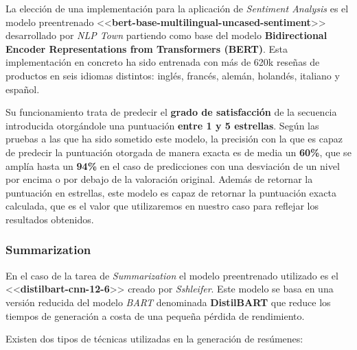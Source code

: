 La elección de una implementación para la aplicación de \emph{Sentiment Analysis} \cite{huggingface:bert_base_multilingual_uncased_sentiment}es el modelo preentrenado <<\textbf{bert-base-multilingual-uncased-sentiment}>> desarrollado por \emph{NLP Town} partiendo como base del modelo \textbf{Bidirectional Encoder Representations from Transformers (BERT)}. Esta implementación en concreto ha sido entrenada con más de 620k reseñas de productos en seis idiomas distintos: inglés, francés, alemán, holandés, italiano y español.

Su funcionamiento trata de predecir el \textbf{grado de satisfacción} de la secuencia introducida otorgándole una puntuación \textbf{entre 1 y 5 estrellas}. Según las pruebas a las que ha sido sometido este modelo, la precisión con la que es capaz de predecir la puntuación otorgada de manera exacta es de media un \textbf{60\%}, que se amplía hasta un \textbf{94\%} en el caso de predicciones con una desviación de un nivel por encima o por debajo de la valoración original. Además de retornar la puntuación en estrellas, este modelo es capaz de retornar la puntuación exacta calculada, que es el valor que utilizaremos en nuestro caso para reflejar los resultados obtenidos.

\subsubsection{Summarization} \label{sec:summarization}

En el caso de la tarea de \emph{Summarization} \cite{huggingface:distilbart_cnn_12_6} el modelo preentrenado utilizado es el <<\textbf{distilbart-cnn-12-6}>> creado por \emph{Sshleifer}. Este modelo se basa en una versión reducida del modelo \emph{BART} denominada \textbf{DistilBART} que reduce los tiempos de generación a costa de una pequeña pérdida de rendimiento.

Existen dos tipos de técnicas utilizadas en la generación de resúmenes:

